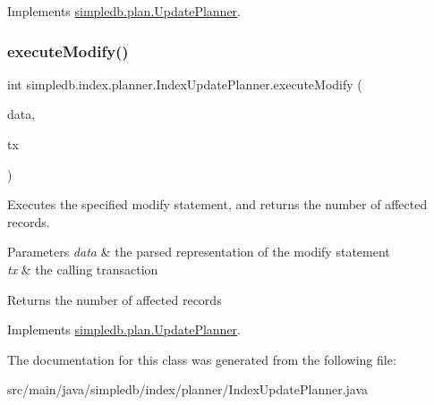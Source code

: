 Implements \hyperlink{interfacesimpledb_1_1plan_1_1UpdatePlanner_a6f2cfe8428b2c5f61204b8606905100e}{simpledb.\+plan.\+Update\+Planner}.

\mbox{\label{classsimpledb_1_1index_1_1planner_1_1IndexUpdatePlanner_a540a81b73146d9d7b1404d62cfcf13ff}} 
\subsubsection{\texorpdfstring{execute\+Modify()}{executeModify()}}
{\footnotesize\ttfamily int simpledb.\+index.\+planner.\+Index\+Update\+Planner.\+execute\+Modify (\begin{DoxyParamCaption}\item[{\hyperlink{classsimpledb_1_1parse_1_1ModifyData}{Modify\+Data}}]{data,  }\item[{\hyperlink{classsimpledb_1_1tx_1_1Transaction}{Transaction}}]{tx }\end{DoxyParamCaption})\hspace{0.3cm}{\ttfamily [inline]}}

Executes the specified modify statement, and returns the number of affected records. 
\begin{DoxyParams}{Parameters}
{\em data} & the parsed representation of the modify statement \\
\hline
{\em tx} & the calling transaction \\
\hline
\end{DoxyParams}
\begin{DoxyReturn}{Returns}
the number of affected records 
\end{DoxyReturn}


Implements \hyperlink{interfacesimpledb_1_1plan_1_1UpdatePlanner_af887ff3fe178adb4fc3b3bee98acde73}{simpledb.\+plan.\+Update\+Planner}.



The documentation for this class was generated from the following file\+:\begin{DoxyCompactItemize}
\item 
src/main/java/simpledb/index/planner/Index\+Update\+Planner.\+java\end{DoxyCompactItemize}
